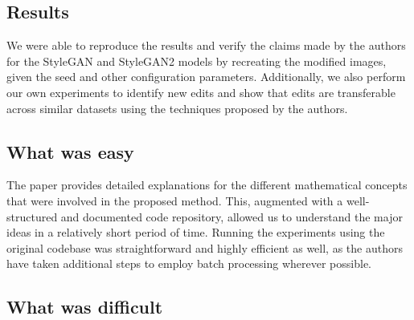 \documentclass{article}
\begin{document}
\subsection*{Results}

We were able to reproduce the results and verify the claims made by the authors for the StyleGAN and StyleGAN2 models by recreating the modified images, given the seed and other configuration parameters.
Additionally, we also perform our own experiments to identify new edits and show that edits are transferable across similar datasets using the techniques proposed by the authors.

\subsection*{What was easy}

The paper provides detailed explanations for the different mathematical concepts that were involved in the proposed method. This, augmented with a well-structured and documented code repository, allowed us to understand the major ideas in a relatively short period of time. Running the experiments using the original codebase was straightforward and highly efficient as well, as the authors have taken additional steps to employ batch processing wherever possible.

\subsection*{What was difficult}
\end{document}
